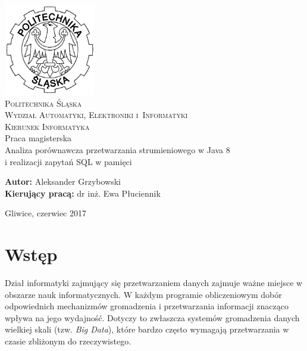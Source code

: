 \documentclass[12pt,twoside,openright]{extarticle}
\let\oldsection\section%
\renewcommand{\section}{\cleardoublepage\oldsection}%
\begin{document}
\begin{titlepage}
    \begin{center}
        \includegraphics[width=4cm]{polsl.png}\\[1cm]
        \textsc{\LARGE{Politechnika Śląska}}\\[0.5cm]
        \textsc{\LARGE{Wydział Automatyki, Elektroniki i~Informatyki}}\\[0.5cm]
        \textsc{\LARGE{Kierunek Informatyka}}\\[2.5cm]
        \LARGE{Praca magisterska}\\[1cm]
        \begingroup
            \fontsize{14pt}{17pt}\selectfont
            Analiza porównawcza przetwarzania strumieniowego w Java 8 \\ i realizacji zapytań SQL w pamięci
        \endgroup
    \end{center}
    \vspace{2cm}
    \begingroup
        \fontsize{14pt}{17pt}\selectfont
        \textbf{Autor:} Aleksander Grzybowski\\
        \textbf{Kierujący pracą:} dr inż. Ewa Płuciennik\\
    \endgroup

    \vspace{2.0cm}
    \begingroup
        \fontsize{12pt}{14pt}\selectfont
        \begin{center}
        Gliwice, czerwiec 2017
        \end{center}
    \endgroup
\end{titlepage}

\clearpage\mbox{}\clearpage

\tableofcontents

\newpage

\section{Wstęp}

    Dział informatyki zajmujący się przetwarzaniem danych zajmuje ważne miejsce w obszarze nauk informatycznych. W każdym programie obliczeniowym dobór odpowiednich mechanizmów gromadzenia i przetwarzania informacji znacząco wpływa na jego wydajność. Dotyczy to zwłaszcza systemów gromadzenia danych wielkiej skali (tzw. \textit{Big Data}), które bardzo często wymagają przetwarzania w czasie zbliżonym do rzeczywistego.
\end{document}
